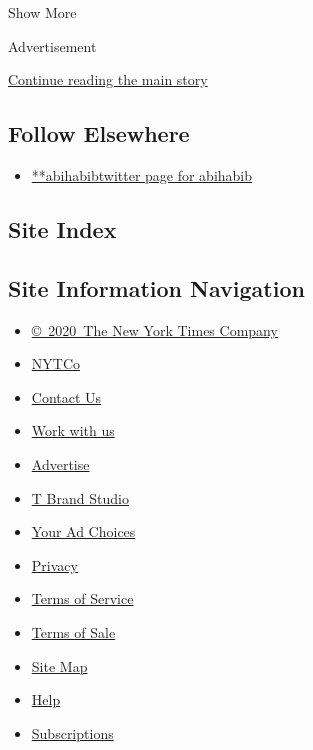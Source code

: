 Show More

Advertisement

\protect\hyperlink{after-mid2}{Continue reading the main story}

\hypertarget{follow-elsewhere}{%
\subsection{Follow Elsewhere}\label{follow-elsewhere}}

\begin{itemize}
\tightlist
\item
  \href{https://twitter.com/abihabib}{**abihabibtwitter page for
  abihabib}
\end{itemize}

\hypertarget{site-index}{%
\subsection{Site Index}\label{site-index}}

\hypertarget{site-information-navigation}{%
\subsection{Site Information
Navigation}\label{site-information-navigation}}

\begin{itemize}
\tightlist
\item
  \href{https://help.nytimes.com/hc/en-us/articles/115014792127-Copyright-notice}{©~2020~The
  New York Times Company}
\end{itemize}

\begin{itemize}
\tightlist
\item
  \href{https://www.nytco.com/}{NYTCo}
\item
  \href{https://help.nytimes.com/hc/en-us/articles/115015385887-Contact-Us}{Contact
  Us}
\item
  \href{https://www.nytco.com/careers/}{Work with us}
\item
  \href{https://nytmediakit.com/}{Advertise}
\item
  \href{http://www.tbrandstudio.com/}{T Brand Studio}
\item
  \href{https://www.nytimes.com/privacy/cookie-policy\#how-do-i-manage-trackers}{Your
  Ad Choices}
\item
  \href{https://www.nytimes.com/privacy}{Privacy}
\item
  \href{https://help.nytimes.com/hc/en-us/articles/115014893428-Terms-of-service}{Terms
  of Service}
\item
  \href{https://help.nytimes.com/hc/en-us/articles/115014893968-Terms-of-sale}{Terms
  of Sale}
\item
  \href{https://spiderbites.nytimes.com}{Site Map}
\item
  \href{https://help.nytimes.com/hc/en-us}{Help}
\item
  \href{https://www.nytimes.com/subscription?campaignId=37WXW}{Subscriptions}
\end{itemize}
